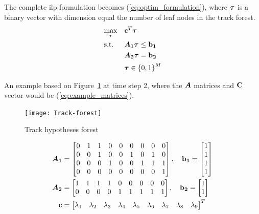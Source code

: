 The complete \gls{ilp} formulation becomes (\ref{eq:optim_formulation}), where \(\boldsymbol{\mathbf{\tau}}\) is a binary vector with dimension equal the number of leaf nodes in the track forest.
\begin{equation}
\begin{aligned}
&	\underset{\boldsymbol{\mathbf{\tau}}}{\text{max}}
&&	\boldsymbol{\mathbf{c}}^T \boldsymbol{\mathbf{\tau}} \\
&	\text{s.t.}
&&	\bm{A_1} \boldsymbol{\mathbf{\tau}} \leq \boldsymbol{\mathbf{b_1}} 	\\
&&&	\bm{A_2} \boldsymbol{\mathbf{\tau}} = \boldsymbol{\mathbf{b_2}}	\\
&&&	\boldsymbol{\mathbf{\tau}} \in {\{0,1\}}^{M}
\end{aligned}
\label{eq:optim_formulation}
\end{equation}

An example based on Figure~\ref{fig:hyp_forest} at time step 2, where the \(\bm{A}\) matrices and \(\boldsymbol{\mathbf{C}}\) vector would be (\ref{eq:example_matrices}).
\begin{figure}[H]
\centering
\texttt{[image: Track-forest]}
\caption{Track hypotheses forest}\label{fig:hyp_forest}
\end{figure}

\begin{equation}
\begin{split}
\bm{A_1} &=\begin{bmatrix}
		0 & 1 & 1 & 0 & 0 & 0 & 0 & 0 & 0 \\
       	0 & 0 & 1 & 0 & 0 & 1 & 0 & 1 & 0 \\
       	0 & 0 & 0 & 1 & 0 & 0 & 1 & 1 & 1 \\
       	0 & 0 & 0 & 0 & 0 & 0 & 0 & 0 & 1 \\
     	\end{bmatrix},\quad
\boldsymbol{\mathbf{b_1}} = 	\begin{bmatrix}
			1 \\ 1  \\ 1 \\ 1
			\end{bmatrix} \\
\bm{A_2} &=\begin{bmatrix}
		1 & 1 & 1 & 1 & 0 & 0 & 0 & 0 & 0 \\
       	0 & 0 & 0 & 0 & 1 & 1 & 1 & 1 & 1 \\
     	\end{bmatrix} ,\quad
\boldsymbol{\mathbf{b_2}} = 	\begin{bmatrix}
			1 \\ 1
			\end{bmatrix} \\
\boldsymbol{\mathbf{c}} &=\begin{bmatrix}
		\lambda_1 & \lambda_2 & \lambda_3 & \lambda_4 & \lambda_5 & \lambda_6 & \lambda_7 & \lambda_8 & \lambda_9
		\end{bmatrix}^T \\
\end{split}
\label{eq:example_matrices}
\end{equation}

